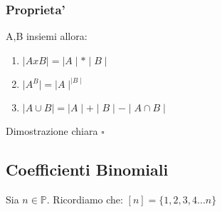 \documentclass{article}
\begin{document}
      \subsubsection{Proprieta'}
      A,B insiemi allora:
      \begin{enumerate}
        \item $\mid AxB \mid = \mid A \mid * \mid B \mid$
        \item $\mid A^B \mid = \mid A \mid^{\mid B \mid}$
        \item $\mid A \cup B \mid = \mid A \mid + \mid B \mid - \mid A \cap B \mid$
      \end{enumerate}
      Dimostrazione chiara $\square$
      \subsection{Coefficienti Binomiali}
      \begin{flushleft}
        Sia $n\in \mathbb{P}$. Ricordiamo che: $[n]=\{1,2,3,4...n\}$
      \end{flushleft}
\end{document}

